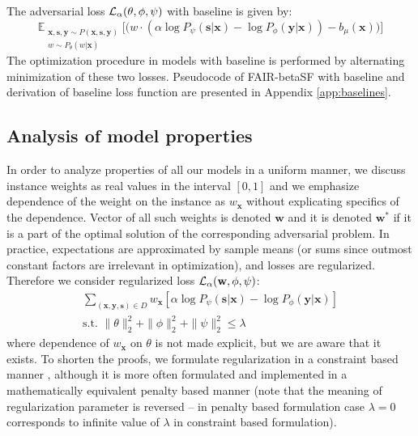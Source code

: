 \documentclass[preprint,12pt]{elsarticle}
\begin{document}
The adversarial loss ${\cal L}_{\alpha}(\theta, \phi, \psi)$ with baseline is given by:
\begin{equation}
\label{Eq.ADVBaseline-loss}
\mathbb{E}_{\substack{\mathbf{x}, \mathbf{s}, \mathbf{y}\sim P(\mathbf{x},\mathbf{s}, \mathbf{y})\\w \sim P_\theta(w|\mathbf{x})}} \Big[ \big(
w \cdot ( \alpha \log P_\psi(\mathbf{s}|\mathbf{x}) - \log P_\phi(\mathbf{y}|\mathbf{x})) - b_\mu(\mathbf{x})\big)\Big]
\end{equation}
The optimization procedure in models with baseline is performed by alternating minimization of these two losses.
Pseudocode of FAIR-betaSF with baseline and derivation of baseline loss function are presented in Appendix \ref{app:baselines}.
\fi


\subsection{Analysis of model properties}
\label{subsec:theoretical}

In order to analyze properties of all our models in a uniform manner, we discuss instance weights as real values in the interval $[0,1]$ and we emphasize dependence of the weight on the instance as $w_\mathbf{x}$ without explicating specifics of the dependence. Vector of all such weights is denoted $\mathbf{w}$ and it is denoted $\mathbf{w}^*$ if it is a part of the optimal solution of the corresponding adversarial problem.
In practice, expectations are approximated by sample means (or sums since outmost constant factors are irrelevant in optimization), and losses are regularized. Therefore we consider regularized loss ${\cal L}_{\alpha}(\mathbf{w}, \phi, \psi)$:
\begin{equation}
\label{Eq:Loss-scalar-new}
\begin{split}
\sum_{(\mathbf{x},\mathbf{y},\mathbf{s})\in D} w_\mathbf{x} [\alpha\log P_{\psi}(\mathbf{s}|\mathbf{x}) -  \log P_{\phi}(\mathbf{y}|\mathbf{x})]\\
\text{s.t. }\|\theta\|^2_2+\|\phi\|^2_2+\|\psi\|^2_2\leq \lambda
\end{split}
\end{equation}
where dependence of $w_\mathbf{x}$ on $\theta$ is not made explicit, but we are aware that it exists.
To shorten the proofs, we formulate regularization in a constraint based manner \cite{tibshirani1996regression}, although it is more often formulated and implemented in a mathematically equivalent penalty based manner (note that the meaning of regularization parameter is reversed -- in penalty based formulation case $\lambda=0$ corresponds to infinite value of $\lambda$ in constraint based formulation).
\end{document}
